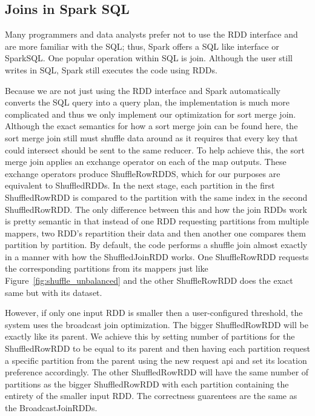 \subsection{Joins in Spark SQL}

Many programmers and data analysts prefer not to use the RDD interface
and are more familiar with the SQL; thus, Spark offers a SQL like interface or SparkSQL. One popular operation within SQL is join.
Although the user still writes in SQL, Spark still executes the code using RDDs.

Because we are not just using the RDD interface and Spark automatically converts the SQL query into a query plan,
the implementation is much more complicated and thus we only implement our optimization for sort merge join.
Although the exact semantics for how a sort merge join can be found here, the sort merge join still must shuffle data around as it requires that every
key that could intersect should be sent to the same reducer.
To help achieve this, the sort merge join applies an exchange operator on each of the map outputs. These exchange operators produce
ShuffleRowRDDS, which for our purposes are equivalent to ShuffledRDDs. In the next stage, each partition in the first ShuffledRowRDD is compared
to the partition with the same index in the second ShuffledRowRDD. The only difference between this and how the join RDDs work is pretty semantic
in  that instead of one RDD requesting partitions from multiple mappers, two RDD's repartition their data and then another one compares them partition by partition.
By default, the code performs a shuffle join almost exactly in a manner with how the ShuffledJoinRDD works. One ShuffleRowRDD requests 
the corresponding partitions from its mappers just like Figure~\ref{fig:shuffle_unbalanced} and the other ShuffleRowRDD does the exact same but with its dataset.  

However, if only one input RDD is smaller then a user-configured threshold, the system uses the broadcast join optimization. The bigger ShuffledRowRDD will be exactly like its
parent. We achieve this by setting number of partitions for the ShuffledRowRDD to be equal to its parent and then having each partition request a specific partition from the parent using the new request api and set its location preference accordingly. The other ShuffledRowRDD will have the same number of partitions as the bigger ShuffledRowRDD with each partition containing the entirety of the smaller input RDD. 
The correctness guarentees are the same as the BroadcastJoinRDDs.  

